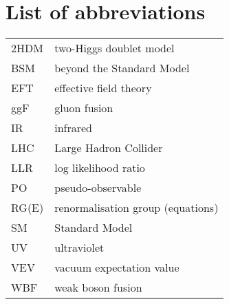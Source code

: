
\chapter*{List of abbreviations}


\begin{tabularx}{\textwidth}{p{1.5cm} L} 
  2HDM & two-Higgs doublet model \\
  BSM & beyond the Standard Model \\
  EFT & effective field theory \\
  ggF & gluon fusion \\
  IR & infrared \\
  LHC & Large Hadron Collider \\
  LLR & log likelihood ratio \\
  PO & pseudo-observable \\
  RG(E) & renormalisation group (equations) \\
  SM & Standard Model \\
  UV & ultraviolet \\
  VEV & vacuum expectation value \\
  WBF & weak boson fusion \\
\end{tabularx}
